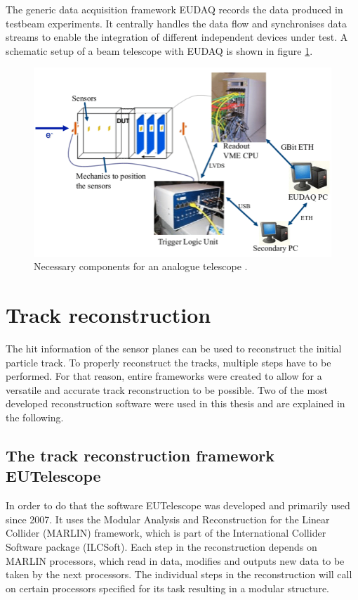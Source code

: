 The generic data acquisition framework EUDAQ \cite{eudaq} records the data produced in testbeam experiments. It centrally handles the data flow and synchronises data streams to enable
the integration of different independent devices under test. A schematic setup of a beam telescope with EUDAQ is shown in figure \ref{fig:eudaq_bild}.

\begin{figure}
  \centering
  \includegraphics[height=0.4\textwidth]{images/eudaq_2.png}
  \caption{Necessary components for an analogue telescope \cite{eudaq_bild_2}.}
  \label{fig:eudaq_bild}
\end{figure}

\chapter{Track reconstruction}
The hit information of the sensor planes can be used to reconstruct the initial particle track. To properly reconstruct the tracks, multiple steps have to
be performed. For that reason, entire frameworks were created to allow for a versatile and accurate track reconstruction to be possible. Two of the most
developed reconstruction software were used in this thesis and are explained in the following.

\section{The track reconstruction framework EUTelescope}
In order to do that the software EUTelescope was developed and
primarily used since 2007. It uses the Modular Analysis and Reconstruction for the Linear Collider (MARLIN) framework, which is part of the
International Collider Software package (ILCSoft). Each step in the reconstruction depends on MARLIN processors, which read in data, modifies and outputs new data to be
taken by the next processors. The individual steps in the reconstruction will call on certain processors specified for its task resulting in a
modular structure.

